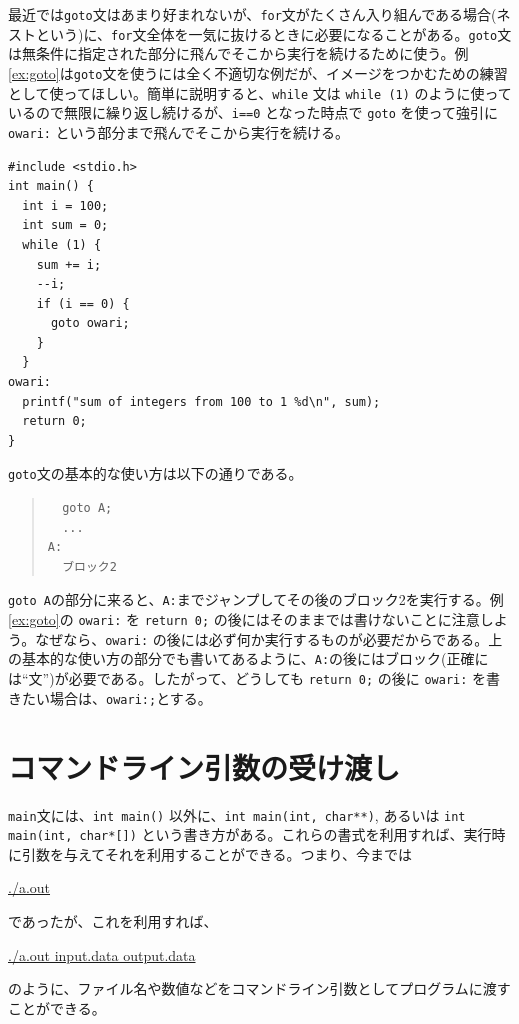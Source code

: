 最近では\verb|goto|文はあまり好まれないが、\verb|for|文がたくさん入り組んである場合(ネストという)に、\verb|for|文全体を一気に抜けるときに必要になることがある。\verb|goto|文は無条件に指定された部分に飛んでそこから実行を続けるために使う。例\ref{ex:goto}は\verb|goto|文を使うには全く不適切な例だが、イメージをつかむための練習として使ってほしい。簡単に説明すると、\verb|while| 文は \verb|while (1)| のように使っているので無限に繰り返し続けるが、\verb|i==0| となった時点で \verb|goto| を使って強引に \verb|owari:| という部分まで飛んでそこから実行を続ける。
\begin{reidai}\label{ex:goto}
\begin{verbatim}
#include <stdio.h>
int main() {
  int i = 100;
  int sum = 0;
  while (1) {
    sum += i;
    --i;
    if (i == 0) {
      goto owari;
    }
  }
owari:
  printf("sum of integers from 100 to 1 %d\n", sum);
  return 0;
}
\end{verbatim}
\end{reidai} \noindent
\verb|goto|文の基本的な使い方は以下の通りである。
\begin{quote}
\begin{verbatim}
  goto A;
  ...
A:
  ブロック2
\end{verbatim}
\end{quote}
\verb|goto A|の部分に来ると、\verb|A:|までジャンプしてその後のブロック2を実行する。例\ref{ex:goto}の \verb|owari:| を \verb|return 0;| の後にはそのままでは書けないことに注意しよう。なぜなら、\verb|owari:| の後には必ず何か実行するものが必要だからである。上の基本的な使い方の部分でも書いてあるように、\verb|A:|の後にはブロック(正確には``文'')が必要である。したがって、どうしても \verb|return 0;| の後に \verb|owari:| を書きたい場合は、\verb|owari:;|とする。

\section{コマンドライン引数の受け渡し}
{\tt main}文には、\verb|int main()| 以外に、\verb|int main(int, char**)|, あるいは \verb|int main(int, char*[])| という書き方がある。これらの書式を利用すれば、実行時に引数を与えてそれを利用することができる。つまり、今までは
\begin{commandline2}
\prompt \underline{./a.out}
\end{commandline2} \noindent
であったが、これを利用すれば、
\begin{commandline2}
\prompt \underline{./a.out input.data output.data}
\end{commandline2} \noindent
のように、ファイル名や数値などをコマンドライン引数としてプログラムに渡すことができる。

